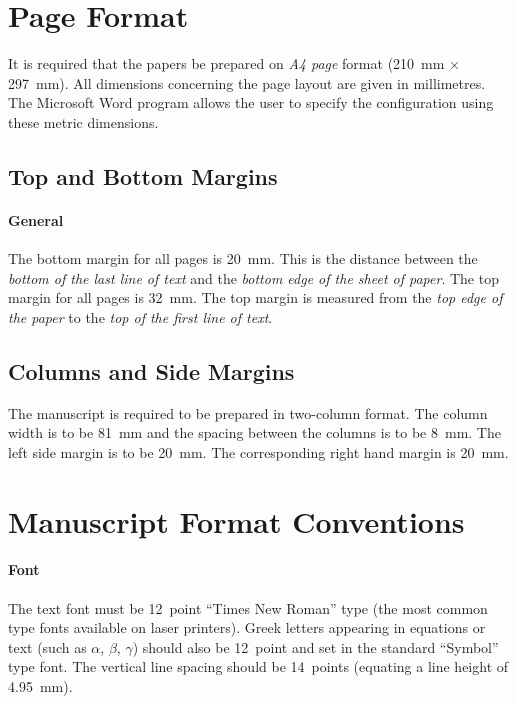\documentclass[bibtex,pagenumbers]{stabs2021}
\begin{document}
\section{Page Format}

It is required that the papers be prepared on \emph{A4 page} format
(210~mm \(\times\) 297~mm). All dimensions concerning the page layout
are given in millimetres. The Microsoft Word program allows the user
to specify the configuration using these metric dimensions.

\subsection{Top and Bottom Margins}

\paragraph{General}

The bottom margin for all pages is 20~mm. This is the distance between
the \emph{bottom of the last line of text} and the \emph{bottom edge
of the sheet of paper}. The top margin for all pages is 32~mm. The top
margin is measured from the \emph{top edge of the paper} to the
\emph{top of the first line of text}.

\subsection{Columns and Side Margins}

The manuscript is required to be prepared in two-column format. The
column width is to be 81~mm and the spacing between the columns is to
be 8~mm. The left side margin is to be 20~mm. The corresponding right
hand margin is 20~mm.

\section{Manuscript Format Conventions}

\paragraph{Font}

The text font must be 12~point ``Times New Roman'' type (the most
common type fonts available on laser printers). Greek letters
appearing in equations or text (such as \(\alpha\), \(\beta\),
\(\gamma\)) should also be 12~point and set in the standard ``Symbol''
type font. The vertical line spacing should be 14~points (equating a
line height of 4.95~mm).
\end{document}
